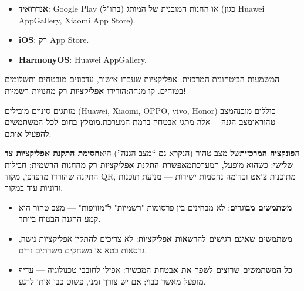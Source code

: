 


\begin{itemize}
  \item \textbf{אנדרואיד}: Google Play (בחו"ל) או החנות המובנית של המותג (כגון Huawei AppGallery, Xiaomi App Store).
  \item \textbf{iOS}: רק App Store.
  \item \textbf{HarmonyOS}: Huawei AppGallery.
\end{itemize}

המשמעות הביטחונית המרכזית: אפליקציות שעברו אישור, עדכונים מובטחים ותשלומים בטוחים. קו מנחה:\textbf{הורידו אפליקציות רק מחנויות רשמיות!}


מותגים סיניים מובילים (Huawei, Xiaomi, OPPO, vivo, Honor) כוללים מובנה\textbf{מצב טהור}או\textbf{מצב הגנה}— אלה מתגי אבטחה ברמת המערכת.\textbf{מומלץ בחום לכל המשתמשים להפעיל אותם}.


ה\textbf{פונקציה המרכזית}של מצב טהור (הנקרא גם “מצב הגנה”) היא\textbf{חסימת התקנת אפליקציות צד שלישי}: כשהוא מופעל, המערכת\textbf{מאפשרת התקנת אפליקציות רק מהחנות הרשמית}; חבילות התקנה שהורדו מדפדפן, מקוד QR, מתוכנות צ'אט וכדומה נחסמות ישירות — מניעת תוכנות זדוניות עוד במקור.


\begin{itemize}
  \item \textbf{משתמשים מבוגרים}: לא מבחינים בין פרסומות "רשמיות" ל"מזויפות" — מצב טהור הוא קמע ההגנה הבטוח ביותר.
  \item \textbf{משתמשים שאינם רגישים להרשאות אפליקציות}: לא צריכים להתקין אפליקציות נישה, גרסאות בטא או משחקים משרתים זרים.
  \item \textbf{כל המשתמשים שרוצים לשפר את אבטחת המכשיר}: אפילו לחובבי טכנולוגיה — עדיף מופעל מאשר כבוי; אם יש צורך זמני, פשוט כבו אותו לרגע.
\end{itemize}


